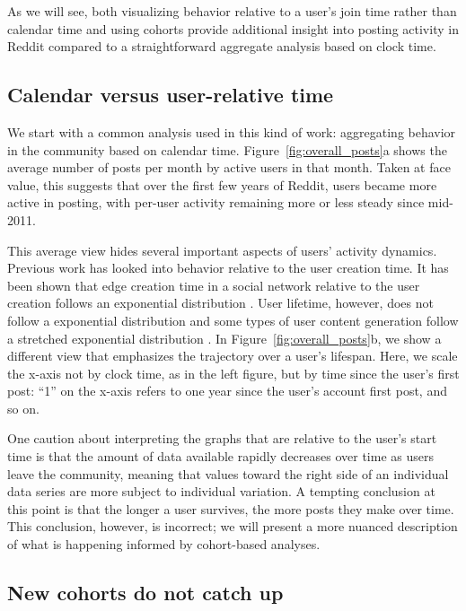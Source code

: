 As we will see, both visualizing behavior relative to a user's join time rather than calendar time and using cohorts provide additional insight into posting activity in Reddit compared to a straightforward aggregate analysis based on clock time.

\subsection{Calendar versus user-relative time}

We start with a common analysis used in this kind of work: aggregating behavior in the community based on calendar time.  Figure~\ref{fig:overall_posts}a shows the average number of posts per month by active users in that month.  Taken at face value, this suggests that over the first few years of Reddit, users became more active in posting, with per-user activity remaining more or less steady since mid-2011.

This average view hides several important aspects of users' activity dynamics. Previous work has looked into behavior relative to the user creation time. It has been shown that edge creation time in a social network relative to the user creation follows an exponential distribution \cite{Tomkins2008}. User lifetime, however, does not follow a exponential distribution and some types of user content generation follow a stretched exponential distribution \cite{Guo2009}. In Figure~\ref{fig:overall_posts}b, we show a different view that emphasizes the trajectory over a user's lifespan.  Here, we scale the x-axis not by clock time, as in the left figure, but by time since the user's first post: ``1'' on the x-axis refers to one year since the user's account first post, and so on.

One caution about interpreting the graphs that are relative to the user's start time is that the amount of data available rapidly decreases over time as users leave the community, meaning that values toward the right side of an individual data series are more subject to individual variation.  A tempting conclusion at this point is that the longer a user survives, the more posts they make over time.  This conclusion, however, is incorrect; we will present a more nuanced description of what is happening informed by cohort-based analyses.

\subsection{New cohorts do not catch up}

